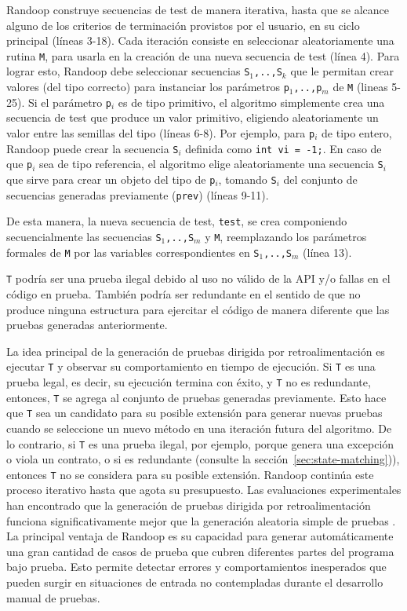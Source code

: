 \textsf{Randoop} construye secuencias de test de manera
iterativa, hasta que se alcance alguno de los criterios de terminación
provistos por el usuario, en su ciclo principal (líneas 3-18). 
Cada iteración consiste en seleccionar aleatoriamente una rutina \texttt{M},
para usarla en la creación de una nueva secuencia de test (línea 4). 
Para lograr esto, \textsf{Randoop} debe seleccionar secuencias \texttt{S$_1$,..,S$_k$}
que le permitan crear valores (del tipo correcto) para instanciar los parámetros 
\texttt{p$_1$,..,p$_m$} de \texttt{M} (lineas 5-25). 
Si el parámetro \texttt{p$_i$} es de tipo primitivo, el algoritmo simplemente
crea una secuencia de test que produce un valor primitivo, eligiendo
aleatoriamente un valor entre las semillas del tipo (líneas 6-8). 
Por ejemplo, para \texttt{p$_i$} de tipo entero, 
\textsf{Randoop} puede crear la secuencia \texttt{S$_i$} definida como 
\texttt{int vi = -1;}.
En caso de que \texttt{p$_i$} sea de tipo referencia, el algoritmo elige
aleatoriamente una secuencia \texttt{S$_i$} que sirve para crear un objeto del
tipo de \texttt{p$_i$}, tomando \texttt{S$_i$} del conjunto de secuencias generadas 
previamente (\texttt{prev}) (líneas 9-11).

De esta manera, la nueva secuencia de test, \texttt{test}, se crea componiendo
secuencialmente las secuencias \texttt{S$_1$,..,S$_m$} y \texttt{M},
reemplazando los parámetros formales de \texttt{M} por las variables
correspondientes en \texttt{S$_1$,..,S$_m$} (línea 13). 

\texttt{T} podría ser una prueba ilegal debido al uso no válido de la API y/o fallas en el código en prueba. También podría ser redundante en el sentido de que no produce ninguna estructura para ejercitar el código de manera diferente que las pruebas generadas anteriormente.

La idea principal de la generación de pruebas dirigida por retroalimentación es ejecutar \texttt{T} y observar su comportamiento en tiempo de ejecución. Si \texttt{T} es una prueba legal, es decir, su ejecución termina con éxito,
y \texttt{T} no es redundante, entonces, \texttt{T} se agrega al conjunto de pruebas generadas previamente. Esto hace que \texttt{T} sea un candidato para su posible extensión para generar nuevas pruebas cuando se seleccione un nuevo método en una iteración futura del algoritmo. De lo contrario, si \texttt{T} es una prueba ilegal, por ejemplo, porque genera una excepción o viola un contrato, o si es redundante (consulte la sección~\ref{sec:state-matching})), entonces \texttt{T} no se considera para su posible extensión. \textsf{Randoop} continúa este proceso iterativo hasta que agota su presupuesto. Las evaluaciones experimentales han encontrado que la generación de pruebas dirigida por retroalimentación funciona significativamente mejor que la generación aleatoria simple de pruebas \cite{Pacheco07,Pacheco08}.
La principal ventaja de \textsf{Randoop} es su capacidad para generar automáticamente una gran cantidad de casos de prueba que cubren diferentes partes del programa bajo prueba. Esto permite detectar errores y comportamientos inesperados que pueden surgir en situaciones de entrada no contempladas durante el desarrollo manual de pruebas.

